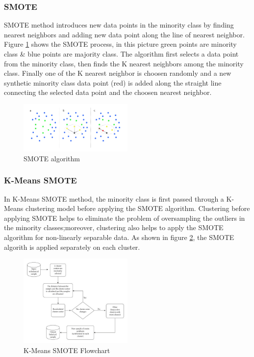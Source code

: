 \documentclass[twoside,11pt,a4paper]{article}
\begin{document}
\subsubsection{\acf{SMOTE}}
\acs{SMOTE} method introduces new data points in the minority class by finding nearest neighbors and adding new data point along the line of nearest neighbor. Figure \ref{fig:smote} shows the \acs{SMOTE} process, in this picture green points are minority class \&  blue points are majority class. The algorithm first selects a data point from the minority class, then finds the K nearest neighbors among the minority class. Finally one of the K nearest neighbor is choosen randomly and a new synthetic minority class data point (red) is added along the straight line connecting the selected data point and the choosen nearest neighbor.

\begin{figure}[ht]
	\centering
	\includegraphics[width=0.5\textwidth]{smote}
	\caption[\acs{SMOTE} algorithm]{\acs{SMOTE} algorithm \citep{schubachimbalance}}
	\label{fig:smote}
\end{figure}
\subsubsection{K-Means \acs{SMOTE}}
In K-Means \acs{SMOTE} method, the minority class is first passed through a K-Means clustering model before applying the \acs{SMOTE} algorithm. Clustering before applying \acs{SMOTE} helps to eliminate the problem of oversampling the outliers in the minority classes;moreover, clustering also helps to apply the \acs{SMOTE} algorithm for non-linearly separable data. As shown in  figure \ref{fig:kmeans_smote}, the SMOTE algorith is applied separately on each cluster.
\begin{figure}[ht]
	\centering
	\includegraphics[width=0.5\textwidth]{kmeans_smote}
	\caption[K-Means \acs{SMOTE} algorithm]{K-Means \acs{SMOTE} Flowchart \citep{chen2021research}}
	\label{fig:kmeans_smote}
\end{figure}
\end{document}
